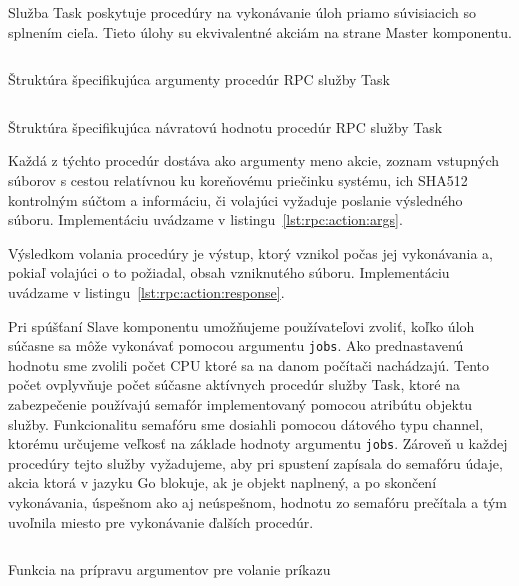 Služba Task poskytuje procedúry na vykonávanie úloh priamo súvisiacich so
splnením cieľa. Tieto úlohy su ekvivalentné akciám na strane Master komponentu.

\begin{listing}[H]
  \inputminted[frame=lines,framesep=2mm,linenos,fontsize=\scriptsize,firstline=8,lastline=12]{go}{/home/pepol/src/imterra/forge/proto/proto.go}
  \caption[Argumenty služby Task]{Štruktúra špecifikujúca argumenty procedúr RPC služby Task}
  \label{lst:rpc:action:args}
\end{listing}

\begin{listing}[H]
  \inputminted[frame=lines,framesep=2mm,linenos,fontsize=\scriptsize,firstline=14,lastline=17]{go}{/home/pepol/src/imterra/forge/proto/proto.go}
  \caption[Návratová hodnota služby Task]{Štruktúra špecifikujúca návratovú hodnotu procedúr RPC služby Task}
  \label{lst:rpc:action:response}
\end{listing}

Každá z týchto procedúr dostáva ako argumenty meno akcie, zoznam vstupných súborov
s cestou relatívnou ku koreňovému priečinku systému, ich SHA512 kontrolným súčtom a informáciu, či volajúci
vyžaduje poslanie výsledného súboru. Implementáciu uvádzame v listingu~\ref{lst:rpc:action:args}.

Výsledkom volania procedúry je výstup, ktorý vznikol počas jej vykonávania a,
pokiaľ volajúci o to požiadal, obsah vzniknutého súboru. Implementáciu uvádzame
v listingu~\ref{lst:rpc:action:response}.

Pri spúšťaní Slave komponentu umožňujeme používateľovi zvoliť, koľko úloh súčasne sa
môže vykonávať pomocou argumentu \texttt{jobs}. Ako prednastavenú hodnotu sme zvolili počet
CPU ktoré sa na danom počítači nachádzajú. Tento počet ovplyvňuje počet súčasne
aktívnych procedúr služby Task, ktoré na zabezpečenie používajú semafór implementovaný
pomocou atribútu objektu služby. Funkcionalitu semafóru sme dosiahli pomocou
dátového typu channel, ktorému určujeme veľkosť na základe hodnoty argumentu \texttt{jobs}.
Zároveň u každej procedúry tejto služby vyžadujeme, aby pri spustení zapísala do semafóru
údaje, akcia ktorá v jazyku Go blokuje, ak je objekt naplnený, a po skončení vykonávania,
úspešnom ako aj neúspešnom, hodnotu zo semafóru prečítala a tým uvoľnila miesto pre
vykonávanie ďalších procedúr.

\begin{listing}[H]
  \inputminted[frame=lines,framesep=2mm,linenos,fontsize=\scriptsize,firstline=9,lastline=22]{go}{/home/pepol/src/imterra/forge/worker/tasks/util.go}
  \caption{Funkcia na prípravu argumentov pre volanie príkazu}
  \label{lst:rpc:processinputs}
\end{listing}

